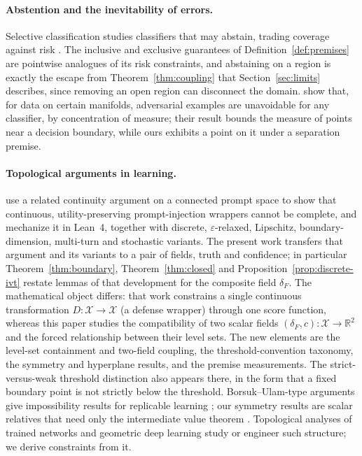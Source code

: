 \documentclass[10pt]{article}
\theoremstyle{definition}
\theoremstyle{remark}
\newcommand{\X}{\mathcal{X}}
\newcommand{\R}{\mathbb{R}}
\newcommand{\conf}{c}
\newcommand{\dF}{\delta_{\!F}}
\begin{document}
\paragraph{Abstention and the inevitability of errors.}
Selective classification studies classifiers that may abstain, trading
coverage against risk \citep{chow1970optimum,elyaniv2010foundations,geifman2017selective}.
The inclusive and exclusive guarantees of Definition~\ref{def:premises}
are pointwise analogues of its risk constraints, and abstaining on a
region is exactly the escape from Theorem~\ref{thm:coupling} that
Section~\ref{sec:limits} describes, since removing an open region can
disconnect the domain. \citet{shafahi2019adversarial} show that, for data
on certain manifolds, adversarial examples are unavoidable for any
classifier, by concentration of measure; their result bounds the measure
of points near a decision boundary, while ours exhibits a point on it
under a separation premise.

\paragraph{Topological arguments in learning.}
\citet{bhatt2026defense} use a related continuity argument on a
connected prompt space to show that continuous, utility-preserving
prompt-injection wrappers cannot be complete, and mechanize it in
Lean~4, together with discrete, $\varepsilon$-relaxed, Lipschitz,
boundary-dimension, multi-turn and stochastic variants. The present work
transfers that argument and its variants to a pair of fields, truth and
confidence; in particular Theorem~\ref{thm:boundary},
Theorem~\ref{thm:closed} and Proposition~\ref{prop:discrete-ivt} restate
lemmas of that development for the composite field $\dF$. The
mathematical object differs: that work constrains a single continuous
transformation $D:\X\to\X$ (a defense wrapper) through one score
function, whereas this paper studies the compatibility of two scalar
fields $(\dF,\conf):\X\to\R^2$ and the forced relationship between
their level sets. The new elements are the level-set containment and
two-field coupling, the threshold-convention taxonomy, the symmetry and
hyperplane results, and the premise measurements. The
strict-versus-weak threshold distinction also appears there, in the form
that a fixed boundary point is not strictly below the threshold. Borsuk--Ulam-type arguments give
impossibility results for replicable learning \citep{chase2024local}; our
symmetry results are scalar relatives that need only the intermediate
value theorem \citep{borsuk1933drei,matousek2003using}. Topological
analyses of trained networks \citep{naitzat2020topology,hensel2021survey}
and geometric deep learning \citep{bronstein2021geometric} study or
engineer such structure; we derive constraints from it.
\end{document}
